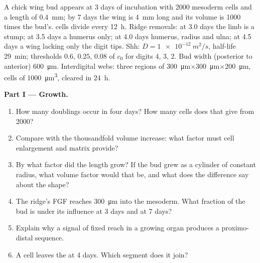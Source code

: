 \begin{problem}
\label{pb:b2:limb-organogenesis:1}
A chick wing bud appears at 3 days of incubation with \num{2000}
mesoderm cells and a length of \qty{0.4}{mm}; by 7 days the wing is
\qty{4}{mm} long and its volume is \num{1000} times the bud's.  cells divide every \qty{12}{h}. Ridge removals: at 3.0 days the
limb is a stump; at 3.5 days a humerus only; at 4.0 days humerus,
radius and ulna; at 4.5 days a wing lacking only the digit tips.
Shh: $D = \qty{1e-12}{m^2/s}$, half-life \qty{29}{min}; thresholds
$0.6$, $0.25$, $0.08$ of $c_0$ for digits 4, 3, 2. Bud width (posterior
to anterior) \qty{600}{\micro m}. Interdigital webs: three regions
of \qty{300}{\micro m}$\times$\qty{300}{\micro m}$\times$\qty{200}{\micro m}, cells
of \qty{1000}{\micro m^3}, cleared in \qty{24}{h}.

\medskip
\noindent\textbf{Part I --- Growth.}
\begin{enumerate}
  \item How many doublings occur in four days? How many cells does
        that give from \num{2000}?
  \item Compare with the thousandfold volume increase: what factor
        must cell enlargement and matrix provide?
  \item By what factor did the length grow? If the bud grew as a
        cylinder of constant radius, what volume factor would that
        be, and what does the difference say about the shape?
  \item The ridge's FGF reaches \qty{300}{\micro m} into the mesoderm.
        What fraction of the bud is under its influence at 3 days
        and at 7 days?
  \item Explain why a signal of fixed reach in a growing organ
        produces a proximo-distal sequence.
  \item A cell leaves the  at 4 days. Which segment does
        it join?
\end{enumerate}


\end{problem}
